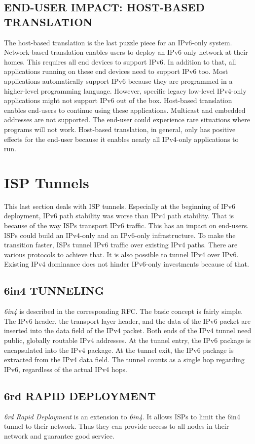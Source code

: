 \documentclass[format=sigconf, natbib=true, nonacm=true]{acmart}
\begin{document}
    \subsection*{END-USER IMPACT: HOST-BASED TRANSLATION}
    The host-based translation is the last puzzle piece for an IPv6-only system. Network-based translation enables users to deploy an IPv6-only network at their homes. This requires all end devices to support IPv6. In addition to that, all applications running on these end devices need to support IPv6 too. Most applications automatically support IPv6 because they are programmed in a higher-level programming language. However, specific legacy low-level IPv4-only applications might not support IPv6 out of the box. Host-based translation enables end-users to continue using these applications. Multicast and embedded addresses are not supported. The end-user could experience rare situations where programs will not work. Host-based translation, in general, only has positive effects for the end-user because it enables nearly all IPv4-only applications to run.
    \section{ISP Tunnels}
    This last section deals with ISP tunnels. Especially at the beginning of IPv6 deployment, IPv6 path stability was worse than IPv4 path stability\cite{7119767}. That is because of the way ISPs transport IPv6 traffic. This has an impact on end-users. ISPs could build an IPv4-only and an IPv6-only infrastructure. To make the transition faster, ISPs tunnel IPv6 traffic over existing IPv4 paths. There are various protocols to achieve that. It is also possible to tunnel IPv4 over IPv6. Existing IPv4 dominance does not hinder IPv6-only investments because of that.
    \subsection{6in4 TUNNELING}
    \textit{6in4} is described in the corresponding RFC\cite{rfc4213}. The basic concept is fairly simple. The IPv6 header, the transport layer header, and the data of the IPv6 packet are inserted into the data field of the IPv4 packet. Both ends of the IPv4 tunnel need public, globally routable IPv4 addresses. At the tunnel entry, the IPv6 package is encapsulated into the IPv4 package. At the tunnel exit, the IPv6 package is extracted from the IPv4 data field. The tunnel counts as a single hop regarding IPv6, regardless of the actual IPv4 hops.
    \subsection{6rd RAPID DEPLOYMENT}
    \textit{6rd Rapid Deployment} is an extension to \textit{6in4}. It allows ISPs to limit the 6in4 tunnel to their network. Thus they can provide access to all nodes in their network and guarantee good service.
\end{document}
